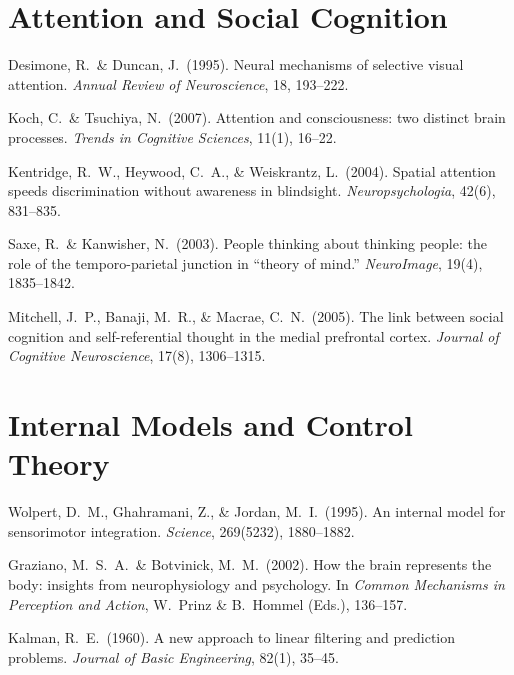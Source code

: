 \documentclass[11pt,a4paper]{report}
\begin{document}
\section*{Attention and Social Cognition}
\begin{enumerate}[label={[\arabic*]}, leftmargin=2.5em, start=10]
  \item Desimone, R.\ \& Duncan, J.\ (1995). Neural mechanisms of selective visual attention. \textit{Annual Review of Neuroscience}, 18, 193--222.
  \item Koch, C.\ \& Tsuchiya, N.\ (2007). Attention and consciousness: two distinct brain processes. \textit{Trends in Cognitive Sciences}, 11(1), 16--22.
  \item Kentridge, R.\ W., Heywood, C.\ A., \& Weiskrantz, L.\ (2004). Spatial attention speeds discrimination without awareness in blindsight. \textit{Neuropsychologia}, 42(6), 831--835.
  \item Saxe, R.\ \& Kanwisher, N.\ (2003). People thinking about thinking people: the role of the temporo-parietal junction in ``theory of mind.'' \textit{NeuroImage}, 19(4), 1835--1842.
  \item Mitchell, J.\ P., Banaji, M.\ R., \& Macrae, C.\ N.\ (2005). The link between social cognition and self-referential thought in the medial prefrontal cortex. \textit{Journal of Cognitive Neuroscience}, 17(8), 1306--1315.
\end{enumerate}

\section*{Internal Models and Control Theory}
\begin{enumerate}[label={[\arabic*]}, leftmargin=2.5em, start=15]
  \item Wolpert, D.\ M., Ghahramani, Z., \& Jordan, M.\ I.\ (1995). An internal model for sensorimotor integration. \textit{Science}, 269(5232), 1880--1882.
  \item Graziano, M.\ S.\ A.\ \& Botvinick, M.\ M.\ (2002). How the brain represents the body: insights from neurophysiology and psychology. In \textit{Common Mechanisms in Perception and Action}, W.\ Prinz \& B.\ Hommel (Eds.), 136--157.
  \item Kalman, R.\ E.\ (1960). A new approach to linear filtering and prediction problems. \textit{Journal of Basic Engineering}, 82(1), 35--45.
\end{enumerate}
\end{document}
